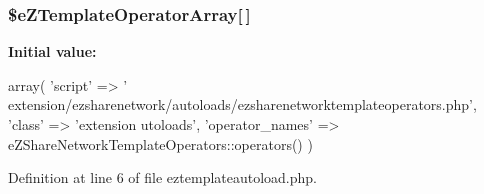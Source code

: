 \hypertarget{eztemplateautoload_8php_a495af2bdf40c64a9e0c519ae1f0febd9}{
\subsubsection[{\$e\-Z\-Template\-Operator\-Array}]{\setlength{\rightskip}{0pt plus 5cm}\$e\-Z\-Template\-Operator\-Array\mbox{[}$\,$\mbox{]}}}\label{eztemplateautoload_8php_a495af2bdf40c64a9e0c519ae1f0febd9}
{\bfseries Initial value\-:}
\begin{DoxyCode}
 array( 'script' => '
      extension/ezsharenetwork/autoloads/ezsharenetworktemplateoperators.php',
                                    'class' => 'extension\ezsharenetwork\a
      utoloads\eZShareNetworkTemplateOperators',
                                    'operator_names' => 
      eZShareNetworkTemplateOperators::operators()
)
\end{DoxyCode}


Definition at line 6 of file eztemplateautoload.\-php.

